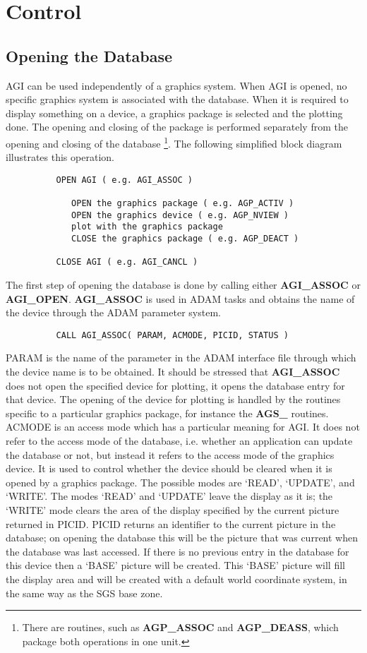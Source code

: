 \section {Control}

\subsection{Opening the Database}

AGI can be used independently of a graphics system. When AGI is opened,
no specific graphics system is associated with the database.
When it is required to display something on a device, a graphics package
is selected and the plotting done. The opening and closing of the package
is performed separately from the opening and closing of the database
\footnote{There are routines, such as {\bf AGP\_ASSOC} and {\bf AGP\_DEASS},
which package both operations in one unit.}.
The following simplified block diagram illustrates this operation.
\begin{verbatim}
          OPEN AGI ( e.g. AGI_ASSOC )

             OPEN the graphics package ( e.g. AGP_ACTIV )
             OPEN the graphics device ( e.g. AGP_NVIEW )
             plot with the graphics package
             CLOSE the graphics package ( e.g. AGP_DEACT )

          CLOSE AGI ( e.g. AGI_CANCL )
\end{verbatim}

The first step of opening the database is done by calling either
{\bf AGI\_ASSOC} or {\bf AGI\_OPEN}. {\bf AGI\_ASSOC} is used in ADAM
tasks and obtains the name of the device through the ADAM parameter
system.
\begin{verbatim}
          CALL AGI_ASSOC( PARAM, ACMODE, PICID, STATUS )
\end{verbatim}
PARAM is the name of the parameter in the ADAM interface file through
which the device name is to be obtained. It should be stressed that
{\bf AGI\_ASSOC} does not open the specified device for plotting, it 
opens the database entry for that device. The opening of the device for
plotting is handled by the routines specific to a particular graphics
package, for instance the {\bf AGS\_} routines.
ACMODE is an access mode which has a particular meaning for AGI. It does
not refer to the access mode of the database, i.e. whether an application
can update the database or not, but instead it refers to the access mode
of the graphics device. It is used to control whether the device should
be cleared when it is opened by a graphics package. The possible modes
are `READ', `UPDATE', and `WRITE'. The modes `READ' and `UPDATE' leave
the display as it is; the `WRITE' mode clears the area of the display
specified by the current picture returned in PICID. PICID returns an
identifier to the current picture in the database; on opening the
database this will be the picture that was current when the database was
last accessed. If there is no previous entry in the database for this
device then a `BASE' picture will be created.
This `BASE' picture will fill the display area and will be created with a
default world coordinate system, in the same way as the SGS base zone.

